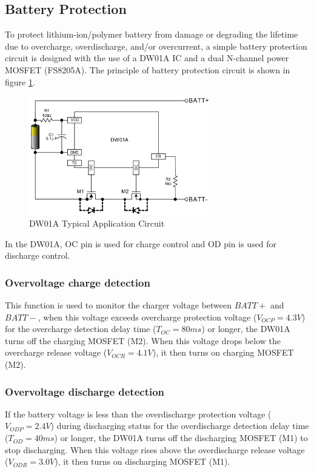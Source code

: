 \documentclass[\main/thesis.tex]{subfiles}
\begin{document}
\subsection{Battery Protection}
To protect lithium-ion/polymer battery from damage or degrading the lifetime due to overcharge, overdischarge, and/or overcurrent, a simple battery protection circuit is designed with the use of a DW01A IC and a dual N-channel power MOSFET (FS8205A). The principle of battery protection circuit is shown in figure \ref{fig:dw01a_typical_use}.
\begin{figure}[H]
    \begin{center}
        \includegraphics[width=0.7\textwidth]{dw01a_typical_use.png}
    \end{center}
    \caption{DW01A Typical Application Circuit}
    \label{fig:dw01a_typical_use}
\end{figure}
In the DW01A, OC pin is used for charge control and OD pin is used for discharge control.
\subsubsection{Overvoltage charge detection}
This function is used to monitor the charger voltage between $BATT+$ and $BATT-$, when this voltage exceeds overcharge protection voltage ($V_{OCP} = 4.3V$) for the overcharge detection delay time ($T_{OC} = 80ms$) or longer,  the DW01A turns off the charging MOSFET (M2). When this voltage drops below the overcharge release voltage ($V_{OCR} = 4.1V$), it then turns on charging MOSFET (M2).

\subsubsection{Overvoltage discharge detection}
If the battery voltage is less than the overdischarge protection voltage ($V_{ODP} = 2.4V$) during discharging status for the overdischarge detection delay time ($T_{OD} = 40ms$) or longer, the DW01A turns off the discharging MOSFET (M1) to stop discharging. When this voltage rises above the overdischarge release voltage ($V_{ODR} = 3.0V$), it then turns on discharging MOSFET (M1).
\end{document}
